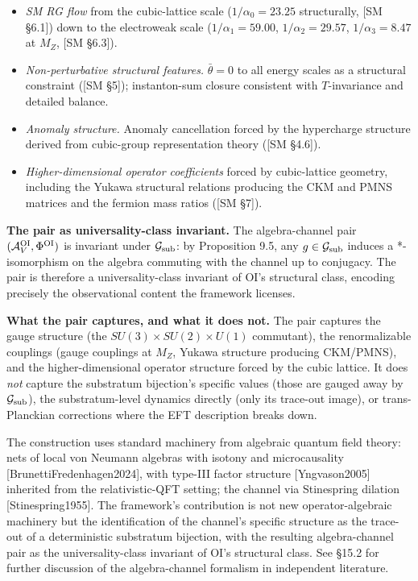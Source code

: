 \documentclass[
]{article}
\providecommand{\tightlist}{%
  \setlength{\itemsep}{0pt}\setlength{\parskip}{0pt}}
\begin{document}
\begin{itemize}
\tightlist
\item
  \emph{SM RG flow} from the cubic-lattice scale (\(1/\alpha_0 = 23.25\)
  structurally, {[}SM §6.1{]}) down to the electroweak scale
  (\(1/\alpha_1 = 59.00\), \(1/\alpha_2 = 29.57\), \(1/\alpha_3 = 8.47\)
  at \(M_Z\), {[}SM §6.3{]}).
\item
  \emph{Non-perturbative structural features.} \(\bar\theta = 0\) to all
  energy scales as a structural constraint ({[}SM §5{]}); instanton-sum
  closure consistent with \(T\)-invariance and detailed balance.
\item
  \emph{Anomaly structure.} Anomaly cancellation forced by the
  hypercharge structure derived from cubic-group representation theory
  ({[}SM §4.6{]}).
\item
  \emph{Higher-dimensional operator coefficients} forced by
  cubic-lattice geometry, including the Yukawa structural relations
  producing the CKM and PMNS matrices and the fermion mass ratios ({[}SM
  §7{]}).
\end{itemize}

\textbf{The pair as universality-class invariant.} The algebra-channel
pair \((\mathcal{A}_V^{\rm OI}, \Phi^{\rm OI})\) is invariant under
\(\mathcal{G}_{\rm sub}\): by Proposition 9.5, any
\(g \in \mathcal{G}_{\rm sub}\) induces a *-isomorphism on the algebra
commuting with the channel up to conjugacy. The pair is therefore a
universality-class invariant of OI's structural class, encoding
precisely the observational content the framework licenses.

\textbf{What the pair captures, and what it does not.} The pair captures
the gauge structure (the \(SU(3) \times SU(2) \times U(1)\) commutant),
the renormalizable couplings (gauge couplings at \(M_Z\), Yukawa
structure producing CKM/PMNS), and the higher-dimensional operator
structure forced by the cubic lattice. It does \emph{not} capture the
substratum bijection's specific values (those are gauged away by
\(\mathcal{G}_{\rm sub}\)), the substratum-level dynamics directly (only
its trace-out image), or trans-Planckian corrections where the EFT
description breaks down.

The construction uses standard machinery from algebraic quantum field
theory: nets of local von Neumann algebras with isotony and
microcausality {[}BrunettiFredenhagen2024{]}, with type-III factor
structure {[}Yngvason2005{]} inherited from the relativistic-QFT
setting; the channel via Stinespring dilation {[}Stinespring1955{]}. The
framework's contribution is not new operator-algebraic machinery but the
identification of the channel's specific structure as the trace-out of a
deterministic substratum bijection, with the resulting algebra-channel
pair as the universality-class invariant of OI's structural class. See
§15.2 for further discussion of the algebra-channel formalism in
independent literature.
\end{document}
